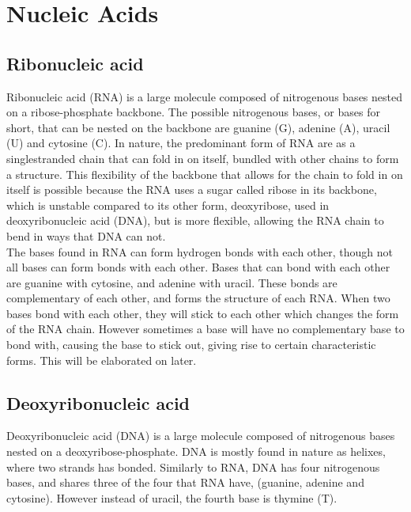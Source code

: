 \section{Nucleic Acids}
\subsection{Ribonucleic acid} %
Ribonucleic acid (RNA) is a large molecule composed of nitrogenous 
bases nested on a ribose-phosphate backbone. The possible nitrogenous bases, or 
bases for short, 
that can be nested on the backbone are guanine (G), adenine (A), uracil (U) and cytosine 
(C). In nature, the predominant form of RNA are as a singlestranded chain 
that can fold in on itself, bundled with other chains to form a structure. 
This flexibility of the backbone that allows for the chain to fold in on itself 
is possible because the RNA uses a sugar called ribose in its backbone, 
which is unstable compared to its other form, deoxyribose, used in 
deoxyribonucleic acid (DNA), but is more flexible, allowing the RNA chain to 
bend in ways that DNA can not.\\

The bases found in RNA can form hydrogen bonds with each other, though not all 
bases can form bonds with each other. Bases that can bond with each other are 
guanine with cytosine, and adenine with uracil. These bonds are complementary 
of each other, and forms the structure of each RNA. When 
two bases bond with each other, they will stick to each other 
which changes the form of the RNA chain. However sometimes a base will have no 
complementary base to bond with, causing the base to stick out, giving rise to 
certain characteristic forms. This will be elaborated on later.

\subsection{Deoxyribonucleic acid}
Deoxyribonucleic acid (DNA) is a large molecule composed of nitrogenous bases 
nested on a deoxyribose-phosphate. DNA is mostly found in nature as helixes, 
where two strands has bonded. Similarly to RNA, DNA has four nitrogenous 
bases, and shares three of the four that RNA have, (guanine, adenine and cytosine). 
However instead of uracil, the fourth base is thymine (T). 



